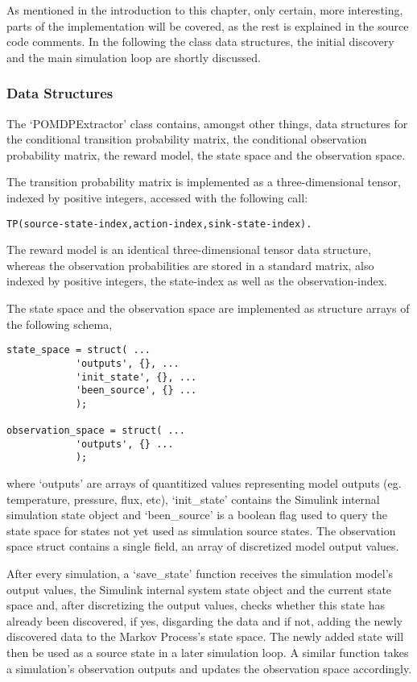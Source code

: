 As mentioned in the introduction to this chapter, only certain, more interesting, parts of the implementation will be covered, as the rest is explained in the source code comments. In the following the class data structures, the initial discovery and the main simulation loop are shortly discussed.

\subsubsection{Data Structures}
The `POMDPExtractor' class contains, amongst other things, data structures for the conditional transition probability matrix, the conditional observation probability matrix, the reward model, the state space and the observation space.

The transition probability matrix is implemented as a three-dimensional tensor, indexed by positive integers, accessed with the following call:
\begin{verbatim}
TP(source-state-index,action-index,sink-state-index).
\end{verbatim}

The reward model is an identical three-dimensional tensor data structure, whereas the observation probabilities are stored in a standard matrix, also indexed by positive integers, the state-index as well as the observation-index.

The state space and the observation space are implemented as structure arrays of the following schema,

\begin{verbatim}
state_space = struct( ...
            'outputs', {}, ...
            'init_state', {}, ...
            'been_source', {} ...
            );

observation_space = struct( ...
            'outputs', {} ...
            );
\end{verbatim}

where `outputs' are arrays of quantitized values representing model outputs (eg. temperature, pressure, flux, etc), `init\_state' contains the Simulink internal simulation state object and `been\_source' is a boolean flag used to query the state space for states not yet used as simulation source states. The observation space struct contains a single field, an array of discretized model output values.

After every simulation, a `save\_state' function receives the simulation model's output values, the Simulink internal system state object and the current state space and, after discretizing the output values, checks whether this state has already been discovered, if yes, disgarding the data and if not, adding the newly discovered data to the Markov Process's state space. The newly added state will then be used as a source state in a later simulation loop. A similar function takes a simulation's observation outputs and updates the observation space accordingly.

